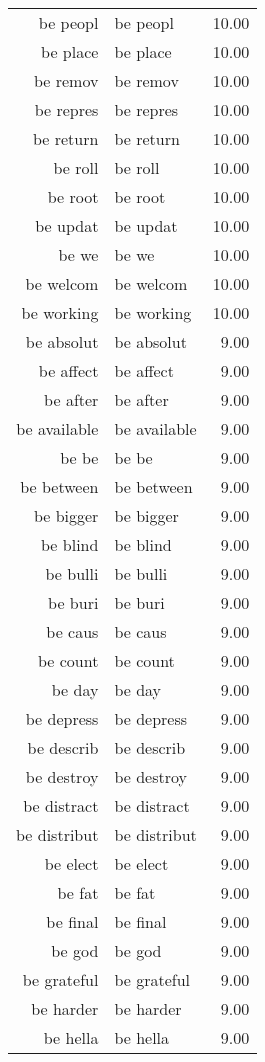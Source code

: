 \begin{table}[ht]
\begin{tabular}{rlr}
  be peopl & be peopl & 10.00 \\ 
  be place & be place & 10.00 \\ 
  be remov & be remov & 10.00 \\ 
  be repres & be repres & 10.00 \\ 
  be return & be return & 10.00 \\ 
  be roll & be roll & 10.00 \\ 
  be root & be root & 10.00 \\ 
  be updat & be updat & 10.00 \\ 
  be we & be we & 10.00 \\ 
  be welcom & be welcom & 10.00 \\ 
  be working & be working & 10.00 \\ 
  be absolut & be absolut & 9.00 \\ 
  be affect & be affect & 9.00 \\ 
  be after & be after & 9.00 \\ 
  be available & be available & 9.00 \\ 
  be be & be be & 9.00 \\ 
  be between & be between & 9.00 \\ 
  be bigger & be bigger & 9.00 \\ 
  be blind & be blind & 9.00 \\ 
  be bulli & be bulli & 9.00 \\ 
  be buri & be buri & 9.00 \\ 
  be caus & be caus & 9.00 \\ 
  be count & be count & 9.00 \\ 
  be day & be day & 9.00 \\ 
  be depress & be depress & 9.00 \\ 
  be describ & be describ & 9.00 \\ 
  be destroy & be destroy & 9.00 \\ 
  be distract & be distract & 9.00 \\ 
  be distribut & be distribut & 9.00 \\ 
  be elect & be elect & 9.00 \\ 
  be fat & be fat & 9.00 \\ 
  be final & be final & 9.00 \\ 
  be god & be god & 9.00 \\ 
  be grateful & be grateful & 9.00 \\ 
  be harder & be harder & 9.00 \\ 
  be hella & be hella & 9.00 \\ 

\end{tabular}
\end{table}
